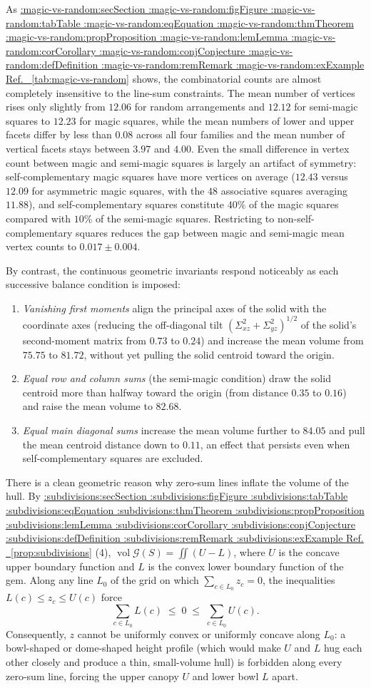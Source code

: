 \documentclass[11pt,a4paper]{article}
\makeatletter
\def\Cref@getprefix#1:#2\relax{#1}
\def\Cref@prefix@sec{sec}
\def\Cref@prefix@fig{fig}
\def\Cref@prefix@tab{tab}
\def\Cref@prefix@eq{eq}
\def\Cref@prefix@thm{thm}
\def\Cref@prefix@prop{prop}
\def\Cref@prefix@lem{lem}
\def\Cref@prefix@cor{cor}
\def\Cref@prefix@conj{conj}
\def\Cref@prefix@def{def}
\def\Cref@prefix@rem{rem}
\def\Cref@prefix@ex{ex}
\def\Cref@type@cap#1{%
  \edef\Cref@tmp{#1}%
  \ifx\Cref@tmp\Cref@prefix@sec Section%
  \else\ifx\Cref@tmp\Cref@prefix@fig Figure%
  \else\ifx\Cref@tmp\Cref@prefix@tab Table%
  \else\ifx\Cref@tmp\Cref@prefix@eq Equation%
  \else\ifx\Cref@tmp\Cref@prefix@thm Theorem%
  \else\ifx\Cref@tmp\Cref@prefix@prop Proposition%
  \else\ifx\Cref@tmp\Cref@prefix@lem Lemma%
  \else\ifx\Cref@tmp\Cref@prefix@cor Corollary%
  \else\ifx\Cref@tmp\Cref@prefix@conj Conjecture%
  \else\ifx\Cref@tmp\Cref@prefix@def Definition%
  \else\ifx\Cref@tmp\Cref@prefix@rem Remark%
  \else\ifx\Cref@tmp\Cref@prefix@ex Example%
  \else Ref.%
  \fi\fi\fi\fi\fi\fi\fi\fi\fi\fi\fi\fi
}
\DeclareRobustCommand{\Cref}[1]{%
  \begingroup
  \edef\Cref@label{#1}%
  \edef\Cref@prefix{\expandafter\Cref@getprefix\Cref@label:\relax}%
  \hyperref[#1]{\Cref@type@cap{\Cref@prefix}~\ref*{#1}}%
  \endgroup
}
\theoremstyle{plain}
\theoremstyle{definition}
\theoremstyle{remark}
\makeatother
\begin{document}
As \Cref{tab:magic-vs-random} shows, the combinatorial counts are almost completely insensitive to the line-sum constraints.
The mean number of vertices rises only slightly from $12.06$ for random arrangements and $12.12$ for semi-magic squares to $12.23$ for magic squares, while the mean numbers of lower and upper facets differ by less than $0.08$ across all four families and the mean number of vertical facets stays between $3.97$ and $4.00$.
Even the small difference in vertex count between magic and semi-magic squares is largely an artifact of symmetry: self-complementary magic squares have more vertices on average ($12.43$ versus $12.09$ for asymmetric magic squares, with the $48$ associative squares averaging $11.88$), and self-complementary squares constitute $40\%$ of the magic squares compared with $10\%$ of the semi-magic squares. Restricting to non-self-complementary squares reduces the gap between magic and semi-magic mean vertex counts to $0.017\pm0.004$.

By contrast, the continuous geometric invariants respond noticeably as each successive balance condition is imposed:
\begin{enumerate}\setlength\itemsep{1pt}
\item \emph{Vanishing first moments} align the principal axes of the solid with the coordinate axes (reducing the off-diagonal tilt $(\Sigma_{xz}^2+\Sigma_{yz}^2)^{1/2}$ of the solid's second-moment matrix from $0.73$ to $0.24$) and increase the mean volume from $75.75$ to $81.72$, without yet pulling the solid centroid toward the origin.
\item \emph{Equal row and column sums} (the semi-magic condition) draw the solid centroid more than halfway toward the origin (from distance $0.35$ to $0.16$) and raise the mean volume to $82.68$.
\item \emph{Equal main diagonal sums} increase the mean volume further to $84.05$ and pull the mean centroid distance down to $0.11$, an effect that persists even when self-complementary squares are excluded.
\end{enumerate}
There is a clean geometric reason why zero-sum lines inflate the volume of the hull. By \Cref{prop:subdivisions}(4), $\operatorname{vol}\mathcal G(S)=\iint(U-L)$, where $U$ is the concave upper boundary function and $L$ is the convex lower boundary function of the gem. Along any line $L_0$ of the grid on which $\sum_{c\in L_0}z_c=0$, the inequalities $L(c)\le z_c\le U(c)$ force
\[
\sum_{c\in L_0}L(c)\;\le\;0\;\le\;\sum_{c\in L_0}U(c).
\]
Consequently, $z$ cannot be uniformly convex or uniformly concave along $L_0$: a bowl-shaped or dome-shaped height profile (which would make $U$ and $L$ hug each other closely and produce a thin, small-volume hull) is forbidden along every zero-sum line, forcing the upper canopy $U$ and lower bowl $L$ apart.
\end{document}

